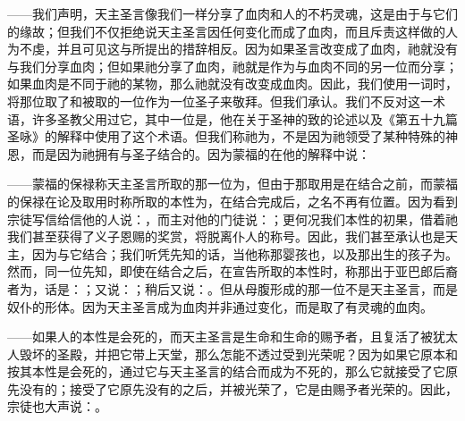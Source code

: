 ——我们声明，天主圣言像我们一样分享了血肉和人的不朽灵魂，这是由于与它们的缘故；但我们不仅拒绝说天主圣言因任何变化而成了血肉，而且斥责这样做的人为不虔，并且可见这与所提出的措辞相反。因为如果圣言改变成了血肉，祂就没有与我们分享血肉；但如果祂分享了血肉，祂就是作为与血肉不同的另一位而分享；如果血肉是不同于祂的某物，那么祂就没有改变成血肉。因此，我们使用一词时，将那位取了和被取的一位作为一位圣子来敬拜。但我们承认。我们不反对这一术语，许多圣教父用过它，其中一位是，他在关于圣神的致的论述以及《第五十九篇圣咏》的解释中使用了这个术语。但我们称祂为，不是因为祂领受了某种特殊的神恩，而是因为祂拥有与圣子结合的。因为蒙福的在他的解释中说：\par

——蒙福的保禄称天主圣言所取的那一位为，但由于那取用是在结合之前，而蒙福的保禄在论及取用时称所取的本性为，在结合完成后，之名不再有位置。因为看到宗徒写信给信他的人说：，而主对他的门徒说：；更何况我们本性的初果，借着祂我们甚至获得了义子恩赐的奖赏，将脱离仆人的称号。因此，我们甚至承认也是天主，因为与它结合；我们听凭先知的话，当他称那婴孩也，以及那出生的孩子为。然而，同一位先知，即使在结合之后，在宣告所取的本性时，称那出于亚巴郎后裔者为，话是：；又说：；稍后又说：。但从母腹形成的那一位不是天主圣言，而是奴仆的形体。因为天主圣言成为血肉并非通过变化，而是取了有灵魂的血肉。\par

——如果人的本性是会死的，而天主圣言是生命和生命的赐予者，且复活了被犹太人毁坏的圣殿，并把它带上天堂，那么怎能不透过受到光荣呢？因为如果它原本和按其本性是会死的，通过它与天主圣言的结合而成为不死的，那么它就接受了它原先没有的；接受了它原先没有的之后，并被光荣了，它是由赐予者光荣的。因此，宗徒也大声说：。\par

